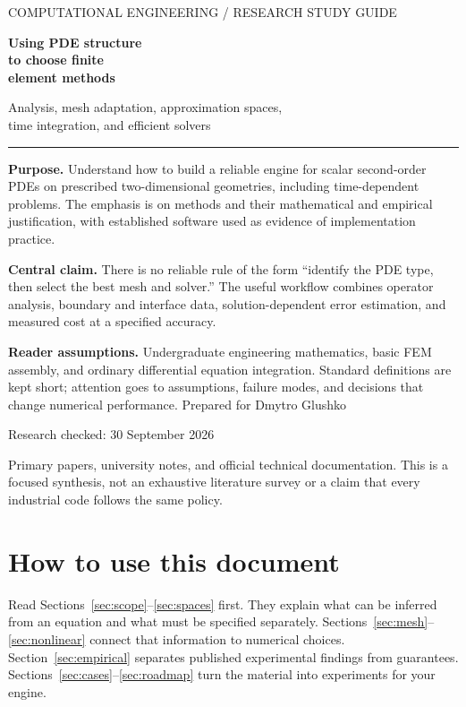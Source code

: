 \documentclass[11pt,a4paper]{article}
\begin{document}
\hypersetup{pageanchor=false}
\begin{titlepage}
\vspace*{16mm}
{\small\textcolor{accent}{COMPUTATIONAL ENGINEERING / RESEARCH STUDY GUIDE}}\par
\vspace{9mm}
{\Huge\bfseries\color{ink}Using PDE structure\\to choose finite\\element methods\par}
\vspace{8mm}
{\Large Analysis, mesh adaptation, approximation spaces,\\time integration, and efficient solvers\par}
\vspace{12mm}
\rule{\textwidth}{0.6pt}\par
\textbf{Purpose.} Understand how to build a reliable engine for scalar second-order PDEs on prescribed two-dimensional geometries, including time-dependent problems. The emphasis is on methods and their mathematical and empirical justification, with established software used as evidence of implementation practice.

\textbf{Central claim.} There is no reliable rule of the form ``identify the PDE type, then select the best mesh and solver.'' The useful workflow combines operator analysis, boundary and interface data, solution-dependent error estimation, and measured cost at a specified accuracy.

\textbf{Reader assumptions.} Undergraduate engineering mathematics, basic FEM assembly, and ordinary differential equation integration. Standard definitions are kept short; attention goes to assumptions, failure modes, and decisions that change numerical performance.
\vfill
Prepared for Dmytro Glushko\par
Research checked: 30 September 2026\par
\small Primary papers, university notes, and official technical documentation. This is a focused synthesis, not an exhaustive literature survey or a claim that every industrial code follows the same policy.
\end{titlepage}
\hypersetup{pageanchor=true}

\section*{How to use this document}
Read Sections~\ref{sec:scope}--\ref{sec:spaces} first. They explain what can be inferred from an equation and what must be specified separately. Sections~\ref{sec:mesh}--\ref{sec:nonlinear} connect that information to numerical choices. Section~\ref{sec:empirical} separates published experimental findings from guarantees. Sections~\ref{sec:cases}--\ref{sec:roadmap} turn the material into experiments for your engine.
\end{document}
